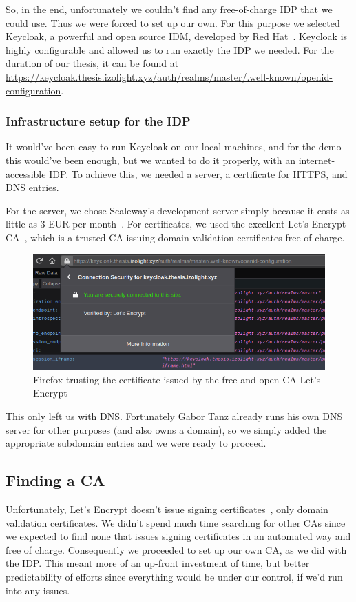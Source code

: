 So, in the end, unfortunately we couldn't find any free-of-charge \gls{IDP} that we could use.
Thus we were forced to set up our own.
For this purpose we selected Keycloak, a powerful and open source \gls{IDM}, developed by Red Hat~\cite{keycloak}.
Keycloak is highly configurable and allowed us to run exactly the \gls{IDP} we needed.
For the duration of our thesis, it can be found at \url{https://keycloak.thesis.izolight.xyz/auth/realms/master/.well-known/openid-configuration}.

\subsubsection{Infrastructure setup for the IDP}
It would've been easy to run Keycloak on our local machines, and for the demo this would've been enough,
but we wanted to do it properly, with an internet-accessible \gls{IDP}.
To achieve this, we needed a server, a certificate for \gls{HTTPS},
and \gls{DNS} entries.

For the server, we chose Scaleway's development server simply because it costs as little as 3 EUR per month~\cite{scaleway}.
For certificates, we used the excellent Let's Encrypt \gls{CA}~\cite{letsencrypt}, which is a trusted \gls{CA} issuing domain validation certificates free of charge.

\begin{figure}
    \begin{center}
        \includegraphics[width=0.7\linewidth]{images/firefox.png}
        \caption{Firefox trusting the certificate issued by the free and open CA Let's Encrypt}
        \label{fig:letsencrypt}
    \end{center}
\end{figure}

This only left us with \gls{DNS}.
Fortunately Gabor Tanz already runs his own \gls{DNS} server for other purposes (and also owns a domain),
so we simply added the appropriate subdomain entries and we were ready to proceed.


\subsection{Finding a CA}\label{subsec:finding-a-ca}
Unfortunately, Let's Encrypt doesn't issue signing certificates~\cite{letsencryptfaq}, only domain validation certificates.
We didn't spend much time searching for other \gls{CA}s since we expected to find none that issues
signing certificates in an automated way and free of charge.
Consequently we proceeded to set up our own \gls{CA}, as we did with the \gls{IDP}.
This meant more of an up-front investment of time,
but better predictability of efforts since everything would be under our control,
if we'd run into any issues.

